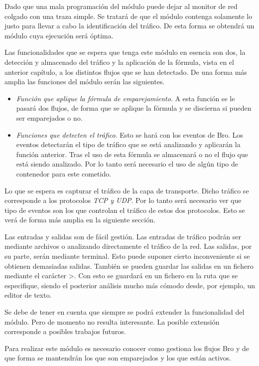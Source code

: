 Dado que una mala programación del módulo puede dejar al monitor de red colgado con una traza simple. Se tratará de 
que el módulo contenga solamente lo justo para llevar a cabo la identificación del tráfico. De esta forma se 
obtendrá un módulo cuya ejecución será óptima. 

\intro Las funcionalidades que se espera que tenga este módulo en esencia son dos, la detección y almacenado 
del tráfico y la aplicación de la fórmula, vista en el anterior capítulo, a los distintos flujos que se han 
detectado. De una forma más amplia las funciones del módulo serán las siguientes. 

\begin{itemize}
\item \textit{Función que aplique la fórmula de emparejamiento}. 
\intro A esta función se le pasará dos flujos, de forma que se aplique la fórmula y se discierna si pueden 
ser emparejados o no.
\item \textit{Funciones que detecten el tráfico}. 
\intro Esto se hará con los eventos de Bro. Los eventos detectarán el tipo de tráfico que se está analizando 
y aplicarán la función anterior.
\intro Tras el uso de esta fórmula se almacenará o no el flujo que está siendo analizado. Por lo tanto 
será necesario el uso de algún tipo de contenedor para este cometido.
\end{itemize}

\intro Lo que se espera es capturar el tráfico de la capa de transporte. Dicho tráfico se corresponde a los 
protocolos \textit{TCP y UDP}. Por lo tanto será necesario ver que tipo de eventos son los que controlan el tráfico 
de estos dos protocolos. Esto se verá de forma más amplia en la siguiente sección.

\intro Las entradas y salidas son de fácil gestión. Las entradas de tráfico podrán ser mediante archivos o 
analizando directamente el tráfico de la red. Las salidas, por su parte, serán mediante terminal. Esto puede 
suponer cierto inconveniente si se obtienen demasiadas salidas. También se pueden guardar las salidas en un 
fichero mediante el carácter >. Con esto se guardará en un fichero en la ruta que se especifique, siendo el 
posterior análisis mucho más cómodo desde, por ejemplo, un editor de texto.

\intro Se debe de tener en cuenta que siempre se podrá extender la funcionalidad del módulo. Pero de momento no 
resulta interesante. La posible extensión corresponde a posibles trabajos futuros.

\intro Para realizar este módulo es necesario conocer como gestiona los flujos Bro y de que forma se mantendrán 
los que son emparejados y los que están activos.

